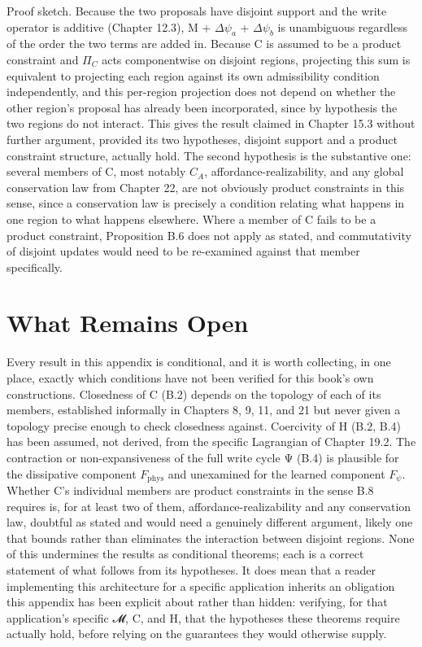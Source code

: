 Proof sketch. Because the two proposals have disjoint support and the write operator is additive (Chapter 12.3), M + \(\Delta\psi_a\) + \(\Delta\psi_b\) is unambiguous regardless of the order the two terms are added in. Because C is assumed to be a product constraint and \(\Pi_C\) acts componentwise on disjoint regions, projecting this sum is equivalent to projecting each region against its own admissibility condition independently, and this per-region projection does not depend on whether the other region's proposal has already been incorporated, since by hypothesis the two regions do not interact. This gives the result claimed in Chapter 15.3 without further argument, provided its two hypotheses, disjoint support and a product constraint structure, actually hold. The second hypothesis is the substantive one: several members of C, most notably \(C_A\), affordance-realizability, and any global conservation law from Chapter 22, are not obviously product constraints in this sense, since a conservation law is precisely a condition relating what happens in one region to what happens elsewhere. Where a member of C fails to be a product constraint, Proposition B.6 does not apply as stated, and commutativity of disjoint updates would need to be re-examined against that member specifically.

\section{What Remains Open}

Every result in this appendix is conditional, and it is worth collecting, in one place, exactly which conditions have not been verified for this book's own constructions. Closedness of C (B.2) depends on the topology of each of its members, established informally in Chapters 8, 9, 11, and 21 but never given a topology precise enough to check closedness against. Coercivity of H (B.2, B.4) has been assumed, not derived, from the specific Lagrangian of Chapter 19.2. The contraction or non-expansiveness of the full write cycle Ψ (B.4) is plausible for the dissipative component \(F_{\mathrm{phys}}\) and unexamined for the learned component \(F_\psi\). Whether C's individual members are product constraints in the sense B.8 requires is, for at least two of them, affordance-realizability and any conservation law, doubtful as stated and would need a genuinely different argument, likely one that bounds rather than eliminates the interaction between disjoint regions. None of this undermines the results as conditional theorems; each is a correct statement of what follows from its hypotheses. It does mean that a reader implementing this architecture for a specific application inherits an obligation this appendix has been explicit about rather than hidden: verifying, for that application's specific 𝓜, C, and H, that the hypotheses these theorems require actually hold, before relying on the guarantees they would otherwise supply.
